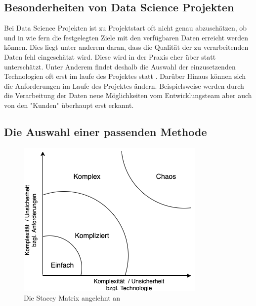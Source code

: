\documentclass[twocolumn,10pt]{asme2ej}
\begin{document}
\subsection{Besonderheiten von Data Science Projekten}
Bei Data Science Projekten ist zu Projektstart oft nicht genau abzuschätzen, ob und in wie fern die festgelegten Ziele mit den verfügbaren Daten erreicht werden können. Dies liegt unter anderem daran, dass die Qualität der zu verarbeitenden Daten fehl eingeschätzt wird. Diese wird in der Praxis eher über statt unterschätzt. Unter Anderem findet deshalb die Auswahl der einzusetzenden Technologien oft erst im laufe des Projektes statt \cite{agile_pm}. Darüber Hinaus können sich die Anforderungen im Laufe des Projektes ändern. Beispielsweise werden durch die Verarbeitung der Daten neue Möglichkeiten vom Entwicklungsteam aber auch von den "Kunden" überhaupt erst erkannt. 

\subsection{Die Auswahl einer passenden Methode}

\begin{figure}
	\includegraphics[scale=0.65	]{stacey.png}
	\caption[center]{Die Stacey Matrix angelehnt an \cite{stacey_img}}
	\label{fig:stacey}
\end{figure}
\end{document}

